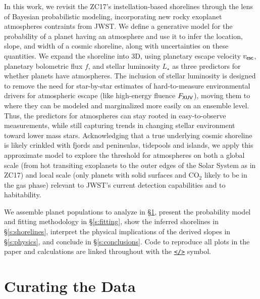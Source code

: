 \documentclass[modern,linenumbers,trackchanges]{aastex7}
\begin{document}
In this work, we revisit the ZC17's instellation-based shorelines through the lens of Bayesian probabilistic modeling, incorporating new rocky exoplanet atmospheres contraints from JWST. We define a generative model for the probability of a planet having an atmosphere and use it to infer the location, slope, and width of a cosmic shoreline, along with uncertainties on these quantities. We expand the shoreline into 3D, using planetary escape velocity $v_{\sf esc}$, planetary bolometric flux $f$, and stellar luminosity $L_\star$ as three predictors for whether planets have atmospheres. The inclusion of stellar luminosity is designed to remove the need for star-by-star estimates of hard-to-measure environmental drivers for atmospheric escape (like high-energy fluence $F_{\sf XUV}$), moving them to where they can be modeled and marginalized more easily on an ensemble level. Thus, the predictors for atmospheres can stay rooted in easy-to-observe measurements, while still capturing trends in changing stellar environment toward lower mass stars. Acknowledging that a true underlying cosmic shoreline is likely crinkled with fjords and peninsulas, tidepools and islands, we apply this approximate model to explore the threshold for atmospheres on both a global scale (from hot transiting exoplanets to the outer edges of the Solar System as in ZC17) and local scale (only planets with solid surfaces and CO$_2$ likely to be in the gas phase) relevant to JWST's current detection capabilities and to habitability.

We assemble planet populations to analyze in \S\ref{s:data}, present the probability model and fitting methodology in \S\ref{s:fitting},  show the inferred shorelines in \S\ref{s:shorelines}, interpret the physical implications of the derived slopes in \S\ref{s:physics}, and conclude in \S\ref{s:conclusions}. Code to reproduce all plots in the paper and calculations are linked throughout with the \href{https://github.com/zkbt/shoreline}{\texttt{</>}} symbol.

\section{Curating the Data}
\label{s:data}
\end{document}
